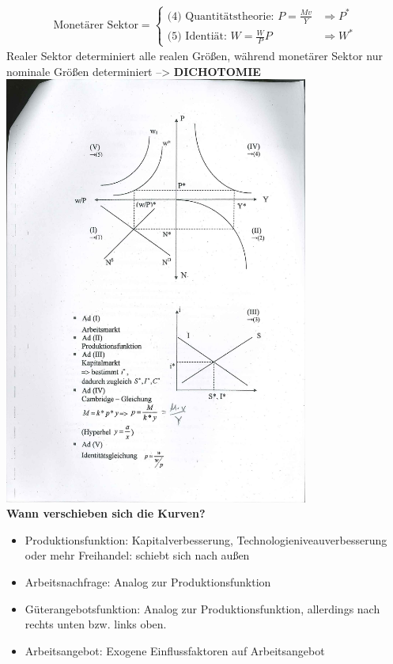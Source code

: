 \documentclass{scrartcl}
\begin{document}
\begin{enumerate}
\begin{align*}
\text{Monet\"{a}rer Sektor} = \begin{cases}
\text{(4) Quantit\"{a}tstheorie: } P=\frac{Mv}{Y} &\Rightarrow P^*\\
\text{(5) Identi\"{a}t: } W=\frac{W}{P}P & \Rightarrow W^*
\end{cases}
\end{align*}
Realer Sektor determiniert alle realen Gr\"{o}{\ss}en, w\"{a}hrend monet\"{a}rer Sektor nur nominale Gr\"{o}{\ss}en determiniert --> \textbf{DICHOTOMIE}\\
\includegraphics[width=0.75\textwidth]{Bilder/Klassik_Gesamt.pdf}\\
\textbf{Wann verschieben sich die Kurven?}
\begin{itemize}
  \item Produktionsfunktion: Kapitalverbesserung, Technologieniveauverbesserung oder mehr Freihandel: schiebt sich nach au{\ss}en
  \item Arbeitsnachfrage: Analog zur Produktionsfunktion
  \item G\"{u}terangebotsfunktion: Analog zur Produktionsfunktion, allerdings nach rechts unten bzw. links oben.
  \item Arbeitsangebot: Exogene Einflussfaktoren auf Arbeitsangebot

\end{itemize}
\end{enumerate}
\end{document}

